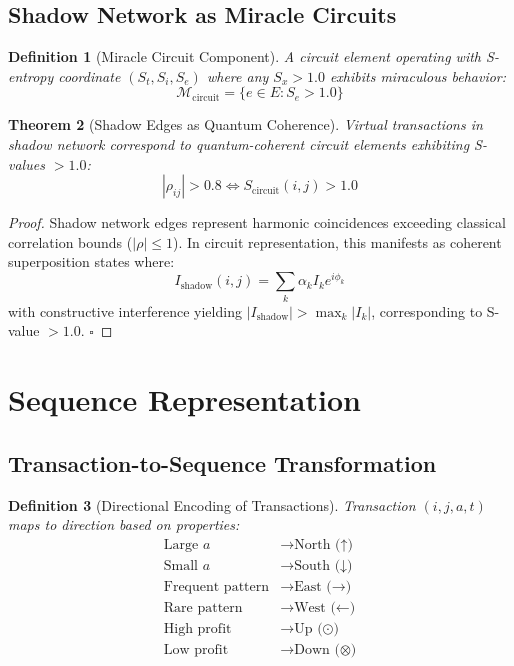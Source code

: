 \documentclass[12pt]{article}
\newtheorem{theorem}{Theorem}
\newtheorem{definition}[theorem]{Definition}
\begin{document}
\subsection{Shadow Network as Miracle Circuits}

\begin{definition}[Miracle Circuit Component]
A circuit element operating with S-entropy coordinate $(S_t, S_i, S_e)$ where any $S_x > 1.0$ exhibits miraculous behavior:
$$
\mathcal{M}_{\text{circuit}} = \{e \in E : S_e > 1.0\}
$$
\end{definition}

\begin{theorem}[Shadow Edges as Quantum Coherence]
Virtual transactions in shadow network correspond to quantum-coherent circuit elements exhibiting S-values $> 1.0$:
$$
|\rho_{ij}| > 0.8 \iff S_{\text{circuit}}(i,j) > 1.0
$$
\end{theorem}

\begin{proof}
Shadow network edges represent harmonic coincidences exceeding classical correlation bounds ($|\rho| \leq 1$). In circuit representation, this manifests as coherent superposition states where:
$$
I_{\text{shadow}}(i,j) = \sum_{k} \alpha_k I_k e^{i\phi_k}
$$
with constructive interference yielding $|I_{\text{shadow}}| > \max_k |I_k|$, corresponding to S-value $> 1.0$.
$\square$
\end{proof}

\section{Sequence Representation}

\subsection{Transaction-to-Sequence Transformation}

\begin{definition}[Directional Encoding of Transactions]
Transaction $(i,j,a,t)$ maps to direction based on properties:
\begin{align}
\text{Large } a & \to \text{North (↑)} \\
\text{Small } a & \to \text{South (↓)} \\
\text{Frequent pattern} & \to \text{East (→)} \\
\text{Rare pattern} & \to \text{West (←)} \\
\text{High profit} & \to \text{Up (⊙)} \\
\text{Low profit} & \to \text{Down (⊗)}
\end{align}
\end{definition}
\end{document}
